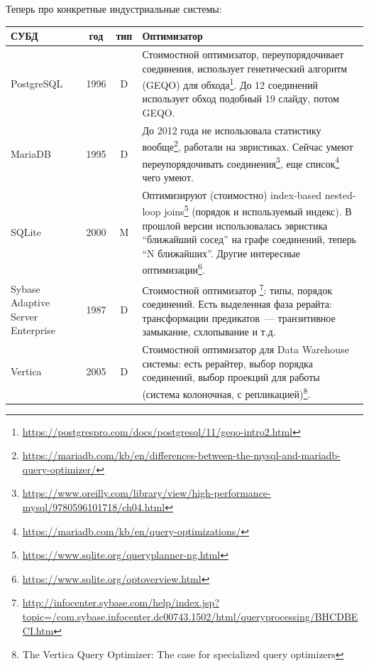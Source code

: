 \documentclass{beamer}
\begin{document}
\begin{frame}[allowframebreaks]
Теперь про конкретные индустриальные системы:

\scriptsize



\begin{table}

\begin{longtable}{|p{2cm}|c|c|p{7.2cm}|}
	\hline
	СУБД & год  & тип  & Оптимизатор \\
	\hline
	
	PostgreSQL & 1996 & D & Стоимостной оптимизатор, переупорядочивает соединения, использует генетический алгоритм (GEQO) для обхода\footnote{\url{https://postgrespro.com/docs/postgresql/11/geqo-intro2.html}}. До 12 соединений использует обход подобный 19 слайду, потом GEQO.\\
	
	MariaDB & 1995 & D & До 2012 года не использовала статистику вообще\footnote{\url{https://mariadb.com/kb/en/differences-between-the-mysql-and-mariadb-query-optimizer/}}, работали на эвристиках. Сейчас умеют переупорядочивать соединения\footnote{\url{https://www.oreilly.com/library/view/high-performance-mysql/9780596101718/ch04.html}}, еще список\footnote{\url{https://mariadb.com/kb/en/query-optimizations/}} чего умеют.\\
	
	SQLite & 2000 & M & Оптимизируют (стоимостно) index-based nested-loop joins\footnote{\url{https://www.sqlite.org/queryplanner-ng.html}} (порядок и используемый индекс). В прошлой версии использовалась эвристика ``ближайший сосед'' на графе соединений, теперь ``N ближайших''. Другие интересные оптимизации\footnote{\url{https://www.sqlite.org/optoverview.html}}.\\
	

	Sybase Adaptive Server Enterprise & 1987 & D & Стоимостной оптимизатор	\footnote{\url{http://infocenter.sybase.com/help/index.jsp?topic=/com.sybase.infocenter.dc00743.1502/html/queryprocessing/BHCDBECI.htm}}: типы, порядок соединений. Есть выделенная фаза рерайта: трансформации предикатов~--- транзитивное замыкание, схлопывание и т.д.\\

	\hline
	\hline
	
	Vertica & 2005 & D & Стоимостной оптимизатор для Data Warehouse системы: есть рерайтер, выбор порядка соединений, выбор проекций для работы (система колоночная, с репликацией)\footnote{ The Vertica Query Optimizer: The case for specialized query optimizers}.\\
	

\end{longtable}
\end{table}
\end{frame}
\end{document}
